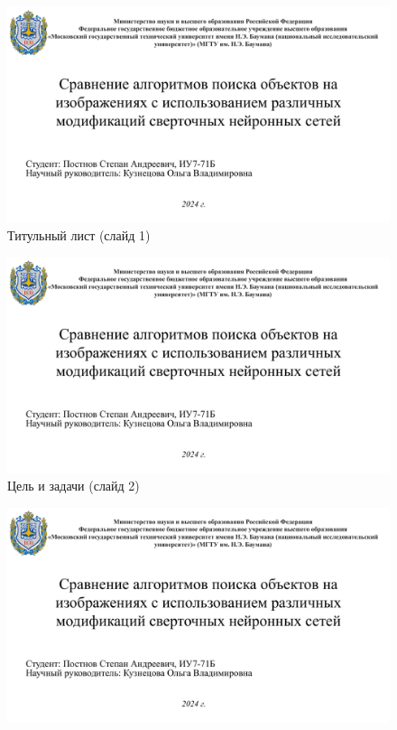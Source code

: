 \begin{appendices}
	\chapter{}
	\begin{figure}[h]
		\centering
		\includegraphics[height=0.4\textheight, page=1, angle=90]{inc/img/pres.pdf}
		\caption{Титульный лист (слайд 1)}
	\end{figure}
	\begin{figure}[h]
		\centering
		\includegraphics[height=0.5\textheight, page=2, angle=90]{inc/img/pres.pdf}
		\caption{Цель и задачи (слайд 2)}
	\end{figure}
	\begin{figure}[h]
		\centering
		\includegraphics[height=0.5\textheight, page=3, angle=90]{inc/img/pres.pdf}

\end{figure}
\end{appendices}
